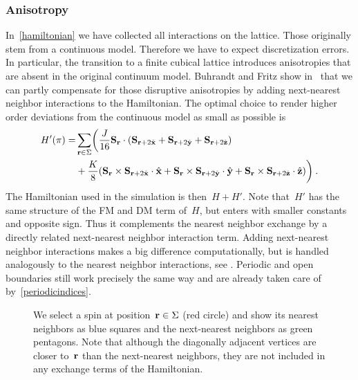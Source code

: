 \subsubsection{Anisotropy}


In~\eqref{hamiltonian} we have collected all interactions on the lattice. Those
originally stem from a continuous model. Therefore we have to expect
discretization errors. In particular, the transition to a finite cubical
lattice introduces anisotropies that are absent in the original continuum model.
Buhrandt and Fritz show in~\cite{skyrmionlattice} that we can partly compensate
for those disruptive anisotropies by adding next-nearest neighbor interactions
to the Hamiltonian. The optimal choice to render higher order deviations from
the continuous model as small as possible is
%
\begin{align}\label{hamiltonianfix}
  H'(\pi) = & \sum_{\mathbf{r} \in \Sigma} \biggl(
  \frac{J}{16} \mathbf{S}_{\mathbf{r}} \cdot (\mathbf{S}_{\mathbf{r}+2\hat{\mathbf{x}}} + \mathbf{S}_{\mathbf{r}+2\hat{\mathbf{y}}} + \mathbf{S}_{\mathbf{r}+2\hat{\mathbf{z}}})\nonumber \\
  &+ \frac{K}{8} (\mathbf{S}_{\mathbf{r}} \times \mathbf{S}_{\mathbf{r}+2\hat{\mathbf{x}}} \cdot \hat{\mathbf{x}} +
        \mathbf{S}_{\mathbf{r}} \times \mathbf{S}_{\mathbf{r}+2\hat{\mathbf{y}}} \cdot \hat{\mathbf{y}} +
        \mathbf{S}_{\mathbf{r}} \times \mathbf{S}_{\mathbf{r}+2\hat{\mathbf{z}}} \cdot \hat{\mathbf{z}})\biggr)\:.
\end{align}
%
The Hamiltonian used in the simulation is then~$H + H'$. Note that~$H'$ has the
same structure of the FM and DM term of~$H$, but enters with smaller constants
and opposite sign. Thus it complements the nearest neighbor exchange by a
directly related next-nearest neighbor interaction term. Adding next-nearest
neighbor interactions makes a big difference computationally, but is handled
analogously to the nearest neighbor interactions, see .
Periodic and open boundaries still work precisely the same way and are already
taken care of by~\eqref{periodicindices}.

\begin{figure}
  \centering
  \caption{We select a spin at position~$\mathbf{r} \in \Sigma$ (red circle) and show
  its nearest neighbors as blue squares and the next-nearest neighbors as green
  pentagons. Note that although the diagonally adjacent vertices are closer
  to~$\mathbf{r}$ than the next-nearest neighbors, they are not included in any
  exchange terms of the Hamiltonian.}
\label{fig:interact}
\end{figure}

